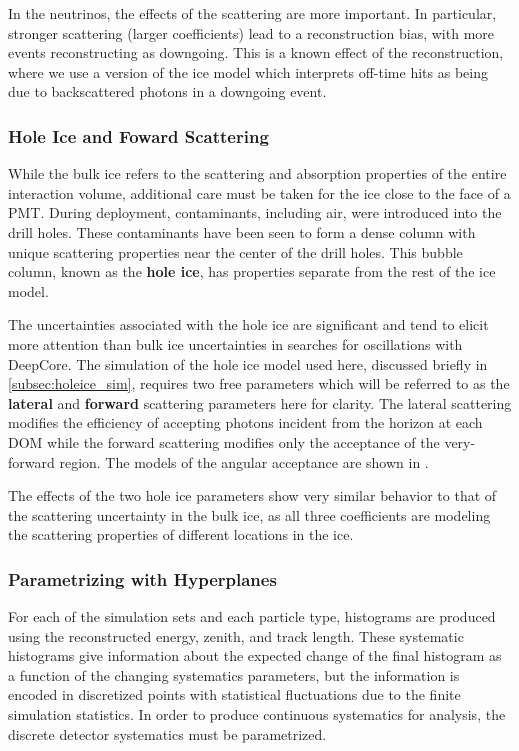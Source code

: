 In the neutrinos, the effects of the scattering are more important.
In particular, stronger scattering (larger coefficients) lead to a reconstruction bias, with more events reconstructing as downgoing.
This is a known effect of the reconstruction, where we use a version of the ice model which interprets off-time hits as being due to backscattered photons in a downgoing event.


\subsubsection{Hole Ice and Foward Scattering}
\label{subsubsec:holeice}
While the bulk ice refers to the scattering and absorption properties of the entire interaction volume, additional care must be taken for the ice close to the face of a PMT.
During deployment, contaminants, including air, were introduced into the drill holes.
These contaminants have been seen to form a dense column with unique scattering properties near the center of the drill holes.
This bubble column, known as the \textbf{hole ice}, has properties separate from the rest of the ice model.

The uncertainties associated with the hole ice are significant and tend to elicit more attention than bulk ice uncertainties in searches for oscillations with DeepCore.
The simulation of the hole ice model used here, discussed briefly in \ref{subsec:holeice_sim}, requires two free parameters which will be referred to as the \textbf{lateral} and \textbf{forward} scattering parameters here for clarity.
The lateral scattering modifies the efficiency of accepting photons incident from the horizon at each DOM while the forward scattering modifies only the acceptance of the very-forward region.
The models of the angular acceptance are shown in .

The effects of the two hole ice parameters show very similar behavior to that of the scattering uncertainty in the bulk ice, as all three coefficients are modeling the scattering properties of different locations in the ice.


\subsubsection{Parametrizing with Hyperplanes}
For each of the simulation sets and each particle type, histograms are produced using the reconstructed energy, zenith, and track length. 
These systematic histograms give information about the expected change of the final histogram as a function of the changing systematics parameters, but the information is encoded in discretized points with statistical fluctuations due to the finite simulation statistics.
In order to produce continuous systematics for analysis, the discrete detector systematics must be parametrized.

